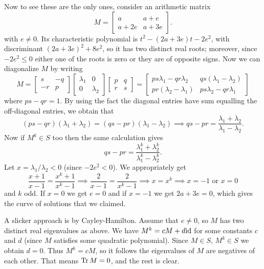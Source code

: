 \begin{problem}
\begin{sol}
		Now to see these are the only ones, consider an arithmetic matrix
		\[ M = \begin{bmatrix} a & a+e \\ a+2e & a+3e \end{bmatrix}. \]
		with $e \neq 0$.
		Its characteristic polynomial is $t^2 - (2a+3e)t - 2e^2$,
		with discriminant $(2a+3e)^2 + 8e^2$,
		so it has two distinct real roots; moreover, since $-2e^2 \le 0$
		either one of the roots is zero or they are of opposite signs.
		Now we can diagonalize $M$ by writing
		\[
			M =
			\begin{bmatrix} s & -q \\ -r & p \end{bmatrix}
			\begin{bmatrix} \lambda_1 & 0 \\ 0 & \lambda_2 \end{bmatrix}
			\begin{bmatrix} p & q \\ r & s \end{bmatrix}
			=
			\begin{bmatrix}
				ps\lambda_1 - qr\lambda_2 & qs(\lambda_1-\lambda_2) \\
				pr(\lambda_2-\lambda_1) & ps\lambda_2 - qr\lambda_1
			\end{bmatrix}
		\]
		where $ps-qr=1$. By using the fact the diagonal entries have sum equalling
		the off-diagonal entries, we obtain that
		\[ (ps-qr)(\lambda_1+\lambda_2) = (qs-pr)(\lambda_1-\lambda_2)
			\implies qs-pr = \frac{\lambda_1+\lambda_2}{\lambda_1-\lambda_2}. \]
		Now if $M^k \in S$ too then the same calculation gives
		\[ qs-pr = \frac{\lambda_1^k+\lambda_2^k}{\lambda_1^k-\lambda_2^k}. \]
		Let $x = \lambda_1/\lambda_2 < 0$ (since $-2e^2 < 0$). We appropriately get
		\[ \frac{x+1}{x-1} = \frac{x^k+1}{x^k-1}
			\implies \frac{2}{x-1} = \frac{2}{x^k-1}
			\implies x = x^k \implies x = -1 \text{ or } x = 0 \]
		and $k$ odd. If $x=0$ we get $e=0$ and if $x=-1$ we get $2a+3e=0$,
		which gives the curve of solutions that we claimed.

		A slicker approach is by Cayley-Hamilton.
		Assume that $e \neq 0$, so $M$ has two distinct real eigenvalues as above.
		We have $M^k = cM + d\mathrm{id}$ for some constants $c$ and $d$
		(since $M$ satisfies some quadratic polynomial).
		Since $M \in S$, $M^k \in S$ we obtain $d=0$.
		Thus $M^k = cM$, so it follows the eigenvalues of $M$ are negatives of each other.
		That means $\operatorname{Tr} M = 0$, and the rest is clear.
	\end{sol}
\end{problem}



